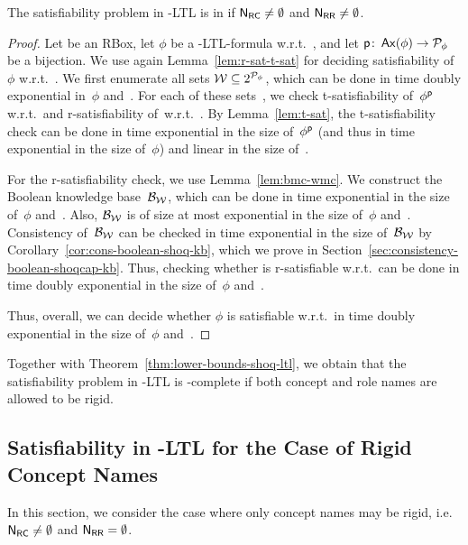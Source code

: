 \begin{theorem}\label{thm:upper-bound-shoq-ltl-rigid-roles}
    The satisfiability problem in \SHOQ-LTL is in \TwoExpTime if
    $\mathsf{N_{RC}}\ne\emptyset$ and $\mathsf{N_{RR}}\ne\emptyset$.
\end{theorem}

\begin{proof}
    Let \Rmc be an RBox, let $\phi$ be a \SHOQ-LTL-formula w.r.t.~\Rmc, and let
    $\mathsf{p}\colon\operatorname{\mathsf{Ax}}(\phi)\to\mathcal{P}_\phi$ be a bijection.  We use again
    Lemma~\ref{lem:r-sat-t-sat} for deciding satisfiability of~$\phi$
    w.r.t.~\Rmc.  We first enumerate all sets $\mathcal{W}\subseteq 2^{\mathcal{P}_\phi}$,
    which can be done in time doubly exponential in~$\phi$ and~\Rmc.  For each
    of these sets~\Wmc, we check t-satisfiability of~$\phi^\mathsf{p}$ w.r.t.~\Wmc and
    r-satisfiability of~\Wmc w.r.t.~\Rmc.  By Lemma~\ref{lem:t-sat}, the
    t-satisfiability check can be done in time exponential in the size
    of~$\phi^\mathsf{p}$ (and thus in time exponential in the size of~$\phi$) and
    linear in the size of~\Wmc.

    For the r-satisfiability check, we use Lemma~\ref{lem:bmc-wmc}.  We
    construct the Boolean knowledge base~$\mathcal{B}_\mathcal{W}$, which can be done in time
    exponential in the size of~$\phi$ and~\Rmc.  Also, $\mathcal{B}_\mathcal{W}$ is of size at
    most exponential in the size of~$\phi$ and~\Rmc.  Consistency of~$\mathcal{B}_\mathcal{W}$
    can be checked in time exponential in the size of~$\mathcal{B}_\mathcal{W}$ by
    Corollary~\ref{cor:cons-boolean-shoq-kb}, which we prove in
    Section~\ref{sec:consistency-boolean-shoqcap-kb}.  Thus, checking whether
    \Wmc is r-satisfiable w.r.t.~\Rmc can be done in time doubly exponential in
    the size of~$\phi$ and~\Rmc.

    Thus, overall, we can decide whether $\phi$ is satisfiable w.r.t.~\Rmc in
    time doubly exponential in the size of~$\phi$ and~\Rmc.
\end{proof}

\noindent
Together with Theorem~\ref{thm:lower-bounds-shoq-ltl}, we obtain that the
satisfiability problem in \SHOQ-LTL is \TwoExpTime-complete if both concept and
role names are allowed to be rigid.


\subsection{Satisfiability in \texorpdfstring{\SHOQ-LTL}{SHOQ-LTL} for the Case of Rigid Concept Names}\label{sec:sat-rigid-concepts}

In this section, we consider the case where only concept names may be rigid,
i.e.~$\mathsf{N_{RC}}\ne\emptyset$ and $\mathsf{N_{RR}}=\emptyset$.

